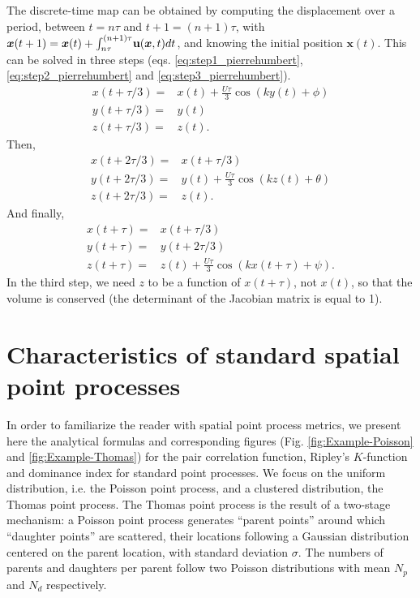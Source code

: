 \documentclass[english]{article}
\newcommand{\bx}{\boldsymbol{x}}
\begin{document}
The discrete-time map can be obtained by computing the displacement
over a period, between $t=n\tau$ and $t+1=(n+1)\tau$, with $\bx(t+1)=\bx(t)+\textbf{\ensuremath{\int_{n\tau}^{\left(n+1\right)\tau}}u}(\bx,t)dt$,
and knowing the initial position $\mathbf{x}(t)$. This can be solved
in three steps (eqs. \ref{eq:step1_pierrehumbert}, \ref{eq:step2_pierrehumbert}
and \ref{eq:step3_pierrehumbert}).
\begin{equation}
\begin{array}{cc}
x(t+\tau/3)= & x(t)+\frac{U\tau}{3}\cos(ky(t)+\phi)\\
y(t+\tau/3)= & y(t)\\
z(t+\tau/3)= & z(t).
\end{array}\label{eq:step1_pierrehumbert}
\end{equation}
Then,
\begin{equation}
\begin{array}{cc}
x(t+2\tau/3)= & x(t+\tau/3)\\
y(t+2\tau/3)= & y(t)+\frac{U\tau}{3}\cos(kz(t)+\theta)\\
z(t+2\tau/3)= & z(t).
\end{array}\label{eq:step2_pierrehumbert}
\end{equation}
And finally,
\begin{equation}
\begin{array}{cc}
x(t+\tau)= & x(t+\tau/3)\\
y(t+\tau)= & y(t+2\tau/3)\\
z(t+\tau)= & z(t)+\frac{U\tau}{3}\cos(kx(t+\tau)+\psi).
\end{array}\label{eq:step3_pierrehumbert}
\end{equation}
In the third step, we need $z$ to be a function of $x(t+\tau)$,
not $x(t)$, so that the volume is conserved (the determinant of the
Jacobian matrix is equal to 1).

\section{Characteristics of standard spatial point processes}

In order to familiarize the reader with spatial point process metrics,
we present here the analytical formulas and corresponding figures
(Fig. \ref{fig:Example-Poisson} and \ref{fig:Example-Thomas}) for
the pair correlation function, Ripley's $K$-function and dominance
index for standard point processes. We focus on the uniform distribution,
i.e. the Poisson point process, and a clustered distribution, the
Thomas point process. The Thomas point process is the result of a
two-stage mechanism: a Poisson point process generates ``parent points''
around which ``daughter points'' are scattered, their locations
following a Gaussian distribution centered on the parent location,
with standard deviation $\sigma$. The numbers of parents and daughters
per parent follow two Poisson distributions with mean $N_{p}$ and
$N_{d}$ respectively.
\end{document}
